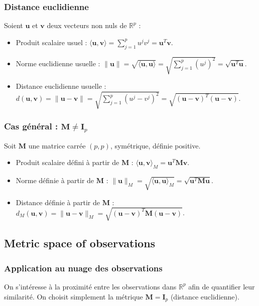 \documentclass[10pt,a4paper]{article}
\begin{document}
\subsubsection*{Distance euclidienne}
Soient $\mathbf{u}$ et $\mathbf{v}$ deux vecteurs non nuls de $\mathbb{R}^p$ :
\begin{itemize}
    \item Produit scalaire usuel : $\langle \mathbf{u}, \mathbf{v} \rangle = \sum_{j=1}^p u^j v^j = \mathbf{u}^T \mathbf{v}$.
    \item Norme euclidienne usuelle : $\|\mathbf{u}\| = \sqrt{\langle \mathbf{u}, \mathbf{u} \rangle} = \sqrt{\sum_{j=1}^p (u^j)^2} = \sqrt{\mathbf{u}^T \mathbf{u}}$.
    \item Distance euclidienne usuelle : $d(\mathbf{u}, \mathbf{v}) = \|\mathbf{u} - \mathbf{v}\| = \sqrt{\sum_{j=1}^p (u^j - v^j)^2} = \sqrt{(\mathbf{u} - \mathbf{v})^T (\mathbf{u} - \mathbf{v})}$.
\end{itemize}

\subsubsection*{Cas général : $\mathbf{M} \neq \mathbf{I}_p$}
Soit $\mathbf{M}$ une matrice carrée $(p, p)$, symétrique, définie positive.
\begin{itemize}
    \item Produit scalaire défini à partir de $\mathbf{M}$ : $\langle \mathbf{u}, \mathbf{v} \rangle_M = \mathbf{u}^T \mathbf{M} \mathbf{v}$.
    \item Norme définie à partir de $\mathbf{M}$ : $\|\mathbf{u}\|_M = \sqrt{\langle \mathbf{u}, \mathbf{u} \rangle_M} = \sqrt{\mathbf{u}^T \mathbf{M} \mathbf{u}}$.
    \item Distance définie à partir de $\mathbf{M}$ : $d_M(\mathbf{u}, \mathbf{v}) = \|\mathbf{u} - \mathbf{v}\|_M = \sqrt{(\mathbf{u} - \mathbf{v})^T \mathbf{M} (\mathbf{u} - \mathbf{v})}$.
\end{itemize}

\subsection*{Metric space of observations}
\subsubsection*{Application au nuage des observations}
On s'intéresse à la proximité entre les observations dans $\mathbb{R}^p$ afin de quantifier leur similarité. On choisit simplement la métrique $\mathbf{M} = \mathbf{I}_p$ (distance euclidienne).
\end{document}
